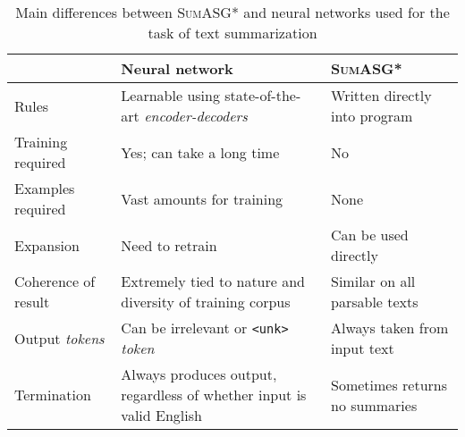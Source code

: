\begin{table}[H]
\centering
\begin{tabular}{@{}L{0.25\textwidth}L{0.4\textwidth}L{0.35\textwidth}@{}}
\toprule
                                        & Neural network                                                                                              & \textsc{SumASG*}                        \\ \midrule
Rules                                   & Learnable using state-of-the-art \textit{encoder-decoders}                                 & Written directly into program  \\
Training required                       & Yes; can take a long time                                                                                   & No                             \\
Examples required                       & Vast amounts for training                                                                                   & None                           \\
Expansion                               & Need to retrain                                                                                             & Can be used directly           \\
Coherence of result                     & Extremely tied to nature and diversity of training corpus                                                   & Similar on all parsable texts  \\
Output \textit{tokens} & Can be irrelevant or \texttt{<unk>} \textit{token} & Always taken from input text   \\
Termination                             & Always produces output, regardless of whether input is valid English                                        & Sometimes returns no summaries \\ \bottomrule
\end{tabular}
\caption{Main differences between \textsc{SumASG*} and neural networks used for the task of text summarization}
\label{table:takeaways}
\end{table}